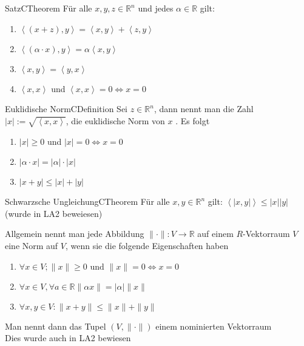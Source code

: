 \documentclass[a4paper]{memoir}
\begin{document}
\begin{ibox}{Satz}{CTheorem}
    Für alle $ x, y, z \in \mathbb{R}^{n} $ und jedes $ \alpha \in  \mathbb{R} $ gilt:
    \begin{enumerate}[label=\alph*)]
        \item $ \left< \left( x + z \right) , y \right> = \left< x,y \right>
            + \left<z, y \right>$ 
        \item $ \left< \left( \alpha \cdot x \right), y \right> = \alpha
            \left< x, y \right>$ 
        \item $ \left< x, y \right> = \left< y,x \right> $ 
        \item $ \left<x,x \right>  $ und $ \left<x,x \right> = 0 \iff x = 0 $
    \end{enumerate}
\end{ibox}

\begin{ibox}{Euklidische Norm}{CDefinition}
   Sei $ z \in \mathbb{R}^n $, dann nennt man die Zahl $ \left| x \right| :=
   \sqrt{ \left<x,x \right>}$, die euklidische Norm von $ x $ . Es folgt 
   \begin{enumerate}[label=\alph*)]
       \item $ \left| x \right| \geq 0  $ und $ \left| x \right| = 0 \iff x = 0$
       \item $ \left| \alpha \cdot x \right|  = \left| \alpha \right| \cdot
           \left| x \right| $ 
       \item $ \left| x + y \right| \leq \left| x \right| + \left| y \right|  $ 
   \end{enumerate}
\end{ibox}

\begin{ibox}{Schwarzsche Ungleichung}{CTheorem}
    Für alle $ x, y \in \mathbb{R}^{n} $ gilt: $ \left< \left| x,y \right| \right>
    \leq \left| x \right| \left| y \right| $  
    \\ (wurde in LA2 beweiesen)
\end{ibox}
Allgemein nennt man jede Abbildung $ \| \cdot \| : V \to \mathbb{R} $ auf einem $
R $-Vektorraum $ V $ eine Norm auf $ V $, wenn sie die folgende Eigenschaften
haben
\begin{enumerate}[label=\alph*)]
    \item $ \forall x \in V; \| x \| \geq 0 \text{ und } \| x \|=0 \iff x=0 $ 
    \item $ \forall x \in V, \forall a \in \mathbb{R} \| \alpha x  \| =
        \left| \alpha \right| \|x \| $ 
	\item $ \forall x, y \in V : \| x+y \| \leq \|x \| + \|y \| $ 
\end{enumerate}
Man nennt dann das Tupel $ \left( V, \| \cdot \| \right)  $ einem nominierten
Vektorraum \\
Dies wurde auch in LA2 bewiesen
\end{document}
